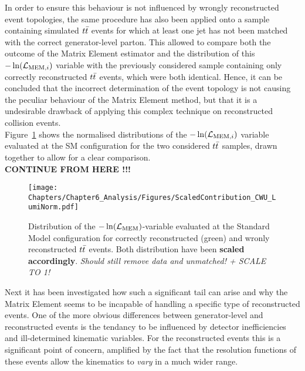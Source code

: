 In order to ensure this behaviour is not influenced by wrongly reconstructed event topologies, the same procedure has also been applied onto a sample containing simulated $t\bar{t}$ events for which at least one jet has not been matched with the correct generator-level parton.
This allowed to compare both the outcome of the Matrix Element estimator and the distribution of this $-\ln(\mathcal{L}_{\textrm{MEM}, i})$ variable with the previously considered sample containing only correctly reconstructed $t\bar{t}$ events, which were both identical.
Hence, it can be concluded that the incorrect determination of the event topology is not causing the peculiar behaviour of the Matrix Element method, but that it is a undesirable drawback of applying this complex technique on reconstructed collision events.
\\
Figure~\ref{fig::SMLikCorrVSWr} shows the normalised distributions of the $-\ln(\mathcal{L}_{\textrm{MEM}, i})$ variable evaluated at the SM configuration for the two considered $t\bar{t}$ samples, drawn together to allow for a clear comparison.\\
\textbf{CONTINUE FROM HERE !!!}
\\
\begin{figure}[h!t]
 \centering
 \texttt{[image: Chapters/Chapter6\_Analysis/Figures/ScaledContribution\_CWU\_LumiNorm.pdf]}
 \caption{Distribution of the $-\ln(\mathcal{L}_{\textrm{MEM}})$-variable evaluated at the Standard Model configuration for correctly reconstructed (green) and wronly reconstructed $t\bar{t}$ events. Both distribution have been \textbf{scaled accordingly}. \textit{Should still remove data and unmatched! + SCALE TO 1!}} \label{fig::SMLikCorrVSWr}
\end{figure}

Next it has been investigated how such a significant tail can arise and why the Matrix Element seems to be incapable of handling a specific type of reconstructed events.
One of the more obvious differences between generator-level and reconstructed events is the tendancy to be influenced by detector inefficiencies and ill-determined kinematic variables. For the reconstructed events this is a significant point of concern, amplified by the fact that the resolution functions of these events allow the kinematics to \textit{vary} in a much wider range.
\\


